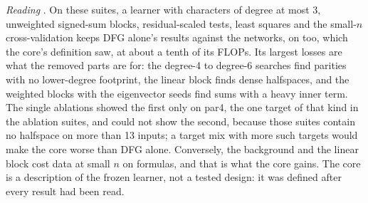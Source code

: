 \emph{Reading} . On these suites, a learner with characters of degree at most 3, unweighted signed-sum blocks, residual-scaled tests, least squares and the small-$n$ cross-validation keeps DFG alone's results against the networks, on  too, which the core's definition saw, at about a tenth of its FLOPs. Its largest losses are what the removed parts are for: the degree-4 to degree-6 searches find parities with no lower-degree footprint, the linear block finds dense halfspaces, and the weighted blocks with the eigenvector seeds find sums with a heavy inner term. The single ablations showed the first only on par4, the one target of that kind in the ablation suites, and could not show the second, because those suites contain no halfspace on more than 13 inputs; a target mix with more such targets would make the core worse than DFG alone. Conversely, the background and the linear block cost data at small $n$ on formulas, and that is what the core gains. The core is a description of the frozen learner, not a tested design: it was defined after every result had been read.
